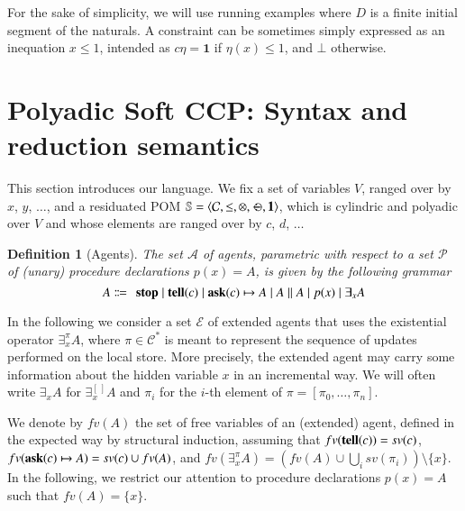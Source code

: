 \documentclass[preprint,12pt]{elsarticle}
\newtheorem{definition}{Definition}
\def\1{{\mathbf 1}}
\newcommand{\tell}{{\bf tell}}
\newcommand{\ask}{{\bf ask}}
\newcommand{\ostop}{{\bf stop}}
\def\monid{{\mathbf 0}}
\def\1{{\mathbf 1}}
\def\odiv{\, {\ominus\hspace{-7.7pt} \div} \,}
\def\monid{\mathbf{1}}
\begin{document}
For the sake of simplicity, we will use running examples 
where 
$D$ is a finite initial segment of the naturals. 
A constraint can be sometimes simply expressed as an inequation $x \leq 1$, 
intended as $c\eta = \monid$ if $\eta(x) \leq 1$, and $\bot$ otherwise.

\section{Polyadic Soft CCP: Syntax and reduction semantics}\label{sec:detpolyadicCCP}
This section introduces our language.
We fix a set of variables $V$, ranged over by $x$, $y$, $\ldots$, and 
a residuated POM $\mathbb S = \langle {\mathcal C}, \leq, \otimes, \odiv, \1\rangle$, 
which is cylindric and polyadic over $V$ and whose elements
are ranged over by $c$, $d$, $\ldots$

\begin{definition}[Agents]%
	The set $\mathcal{A}$ of agents, %
	parametric with respect to a set $\mathcal{P}$ of (unary) procedure declarations $p(x) = A$,
	is given by the following grammar
	\[ A \Coloneqq \: \: \mathit{\ostop} \mid \textit{\tell}(c)  \mid \textit{\ask}(c) \mapsto A \mid A \parallel A \mid %
	p(x) \mid \exists_x A\]  
\end{definition}

In the following we consider 
a set $\mathcal{E}$ of extended agents that uses the existential operator $\exists^{\pi}_x A$, 
where $\pi \in {\mathcal C}^\ast$ is meant to represent the sequence of updates performed on the local store. 
More precisely, the extended agent may carry some information about the hidden variable 
$x$ in an incremental way. We will often write $\exists_x A$ for $\exists^{[ \,]}_x A$ and $\pi_i$ for 
the $i$-th element of $\pi = [ \pi_0, \ldots, \pi_n]$.

We denote by $fv(A)$ the set of free variables of an (extended) agent, defined in the expected way 
by structural induction, assuming that $fv(\tell(c)) = sv(c)$,
$fv(\ask(c) \mapsto A) = sv(c) \cup fv(A)$,
and $fv(\exists^{\pi}_x A) = (fv(A) \cup \bigcup_i sv(\pi_i)) \setminus \{x\}$.
%
In the following, we restrict our attention to 
procedure declarations $p(x) = A$ such that $fv(A) = \{x\}$.
\end{document}
